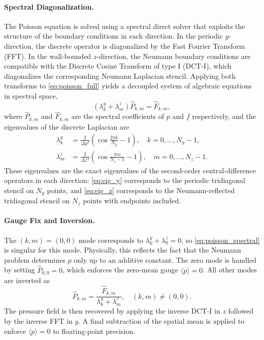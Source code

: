 \paragraph{Spectral Diagonalization.}
The Poisson equation is solved using a spectral direct solver that
exploits the structure of the boundary conditions in each direction. In
the periodic $y$-direction, the discrete operator is diagonalized by the
Fast Fourier Transform (FFT). In the wall-bounded $z$-direction, the
Neumann boundary conditions are compatible with the Discrete Cosine
Transform of type I (DCT-I), which diagonalizes the corresponding
Neumann Laplacian stencil. Applying both transforms to
\eqref{eq:poisson_full} yields a decoupled system of algebraic equations
in spectral space,
\begin{equation}
    \left(\lambda^y_k + \lambda^z_m\right)\hat{P}_{k,m} = \hat{F}_{k,m},
    \label{eq:poisson_spectral}
\end{equation}
where $\hat{P}_{k,m}$ and $\hat{F}_{k,m}$ are the spectral coefficients
of $p$ and $f$ respectively, and the eigenvalues of the discrete
Laplacian are
\begin{align}
    \lambda^y_k &= \frac{2}{\Delta y^2}
        \left(\cos\frac{2\pi k}{N_y} - 1\right),
        \quad k = 0, \ldots, N_y - 1,
        \label{eq:eig_y} \\
    \lambda^z_m &= \frac{2}{\Delta z^2}
        \left(\cos\frac{\pi m}{N_z - 1} - 1\right),
        \quad m = 0, \ldots, N_z - 1.
        \label{eq:eig_z}
\end{align}
These eigenvalues are the exact eigenvalues of the second-order
central-difference operators in each direction: \eqref{eq:eig_y}
corresponds to the periodic tridiagonal stencil on $N_y$ points, and
\eqref{eq:eig_z} corresponds to the Neumann-reflected tridiagonal
stencil on $N_z$ points with endpoints included.

\paragraph{Gauge Fix and Inversion.}
The $(k,m) = (0,0)$ mode corresponds to $\lambda^y_0 + \lambda^z_0 = 0$,
so \eqref{eq:poisson_spectral} is singular for this mode. Physically,
this reflects the fact that the Neumann problem determines $p$ only up
to an additive constant. The zero mode is handled by setting
$\hat{P}_{0,0} = 0$, which enforces the zero-mean gauge
$\langle p \rangle = 0$. All other modes are inverted as
\begin{equation}
    \hat{P}_{k,m} = \frac{\hat{F}_{k,m}}{\lambda^y_k + \lambda^z_m},
    \quad (k,m) \neq (0,0).
    \label{eq:poisson_invert}
\end{equation}
The pressure field is then recovered by applying the inverse DCT-I in
$z$ followed by the inverse FFT in $y$. A final subtraction of the
spatial mean is applied to enforce $\langle p \rangle = 0$ to
floating-point precision.

